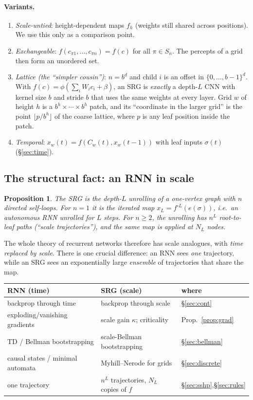 \documentclass[11pt]{article}
\newtheorem{proposition}[theorem]{Proposition}
\theoremstyle{definition}
\newcommand{\Nint}{N_{L}}
\begin{document}
\paragraph{Variants.}
\begin{enumerate}
\item \emph{Scale-untied}: height-dependent maps $f_h$ (weights still shared across positions).
We use this only as a comparison point.
\item \emph{Exchangeable}: $f(c_{\pi 1},\dots,c_{\pi n})=f(c)$ for all $\pi\in S_n$.
The percepts of a grid then form an unordered set.
\item \emph{Lattice (the ``simpler cousin'')}: $n=b^d$ and child $i$ is an offset in
$\{0,\dots,b-1\}^d$. With $f(c)=\phi(\sum_i W_i c_i+\beta)$, an SRG is \emph{exactly} a depth-$L$
CNN with kernel size $b$ and stride $b$ that uses the same weights at every layer.
Grid $w$ of height $h$ is a $b^h\times\cdots\times b^h$ patch, and its ``coordinate in the
larger grid'' is the point $\lfloor p/b^h\rfloor$ of the coarse lattice, where $p$ is any leaf
position inside the patch.
\item \emph{Temporal}: $x_w(t)=f(C_w(t),x_w(t-1))$ with leaf inputs $\sigma(t)$ (\S\ref{sec:time}).
\end{enumerate}

\subsection{The structural fact: an RNN in scale}\label{sec:rnn}
\begin{proposition}\label{prop:rnn}
The SRG is the depth-$L$ unrolling of a one-vertex graph with $n$ directed self-loops. For $n=1$
it is the iterated map $x_L=f^{\circ L}(e(\sigma))$, i.e.\ an autonomous RNN unrolled for $L$
steps. For $n\ge2$, the unrolling has $n^L$ root-to-leaf paths (``scale trajectories''), and the
same map is applied at $\Nint$ nodes.
\end{proposition}
The whole theory of recurrent networks therefore has scale analogues, with \emph{time replaced
by scale}. There is one crucial difference: an RNN sees \emph{one} trajectory, while an SRG
sees an exponentially large \emph{ensemble} of trajectories that share the map.
\begin{center}\begin{tabular}{lll}\toprule
RNN (time) & SRG (scale) & where\\\midrule
backprop through time & backprop through scale & \S\ref{sec:cont}\\
exploding/vanishing gradients & scale gain $\kappa$; criticality & Prop.~\ref{prop:grad}\\
TD / Bellman bootstrapping & scale-Bellman bootstrapping & \S\ref{sec:bellman}\\
causal states / minimal automata & Myhill--Nerode for grids & \S\ref{sec:discrete}\\
one trajectory & $n^L$ trajectories, $\Nint$ copies of $f$ & \S\ref{sec:sshp},\S\ref{sec:rules}\\
\bottomrule\end{tabular}\end{center}
\end{document}
